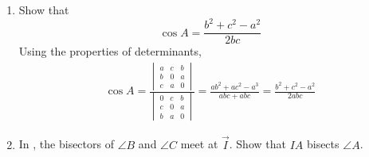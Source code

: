 \begin{enumerate}[label=\thesection.\arabic*.,ref=\thesection.\theenumi]
\begin{figure}[!ht]
\begin{center}
		\resizebox{0.6\columnwidth}{!}{}
	\end{center}
	\caption{The cosine formula}
	\label{fig:tri_cosine_formula}	
\end{figure}
\solution From Fig. \ref{fig:tri_cosine_formula}, 
%
\begin{align}
	a &= x + y = b \cos C + c \cos B = \myvec{  \cos C & \cos B } \myvec{ b \\ c }
	\\
&=\myvec{0 & b & c } \myvec{ \cos A \\ \cos C \\ \cos B } 
\end{align}
%
Similarly,
%
\begin{align}
b &= c \cos A + a \cos C 
=\myvec{c & 0 & a } \myvec{ \cos A \\ \cos C \\ \cos B } 
	\\
c &= b \cos A + a \cos B
=\myvec{b & a & 0 } \myvec{ \cos A \\ \cos C \\ \cos B } 
\end{align}
%
The above equations can be expressed in matrix form as
\eqref{eq:tri_cos_mat}.

\item Show that 
\begin{equation}
\label{eq:tri_cos_form}
\cos A = \frac{b^2+c^2-a^2}{2bc}
\end{equation}
%
\solution 
Using the properties of determinants,
%
\begin{align}
\cos A = \frac{
\begin{vmatrix}
a & c & b \\
b & 0 & a \\
c & a & 0
\end{vmatrix}
	}
	{
\begin{vmatrix}
0 & c & b \\
c & 0 & a \\
b & a & 0
\end{vmatrix}
	}
	=\frac{ab^2 + ac^2 - a^3}{abc + abc} 
= \frac{b^2 + c^2 - a^2}{2abc}
\end{align}
\item  In  
	, the bisectors of $\angle B$ and $\angle C$	 meet at $\vec{I}$.
Show that $IA$ bisects $\angle A$.
\begin{figure}[!ht]
	\begin{center}
		

\end{center}
\end{figure}
\end{enumerate}
